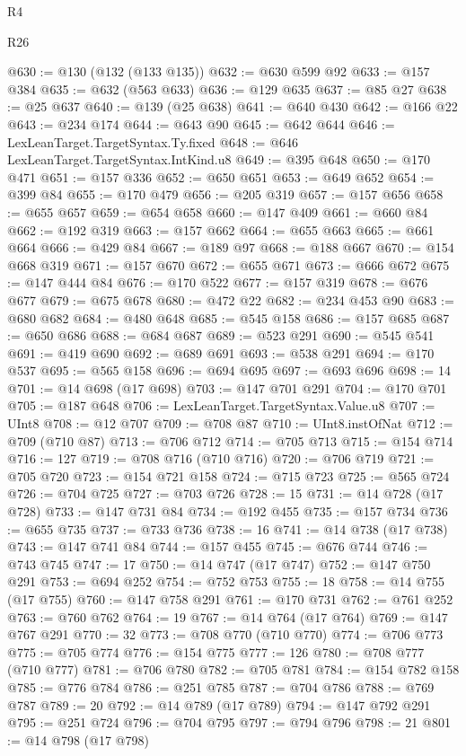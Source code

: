 \begin{lexlean}{R4}
\begin{lexlean}{R26}
\begin{coremodule}
{{{{{{{{{{{{{{{{{{{{{{{{{{{{{{{{{{{{{{{{{{{{{{{{{{{{{{{{{{{{{{{{{{{{{{{{@630 := @130 (@132 (@133 @135))
@632 := @630 @599 @92
@633 := @157 @384
@635 := @632 (@563 @633)
@636 := @129 @635
@637 := @85 @27
@638 := @25 @637
@640 := @139 (@25 @638)
@641 := @640 @430
@642 := @166 @22
@643 := @234 @174
@644 := @643 @90
@645 := @642 @644
@646 := LexLeanTarget.TargetSyntax.Ty.fixed
@648 := @646 LexLeanTarget.TargetSyntax.IntKind.u8
@649 := @395 @648
@650 := @170 @471
@651 := @157 @336
@652 := @650 @651
@653 := @649 @652
@654 := @399 @84
@655 := @170 @479
@656 := @205 @319
@657 := @157 @656
@658 := @655 @657
@659 := @654 @658
@660 := @147 @409
@661 := @660 @84
@662 := @192 @319
@663 := @157 @662
@664 := @655 @663
@665 := @661 @664
@666 := @429 @84
@667 := @189 @97
@668 := @188 @667
@670 := @154 @668 @319
@671 := @157 @670
@672 := @655 @671
@673 := @666 @672
@675 := @147 @444 @84
@676 := @170 @522
@677 := @157 @319
@678 := @676 @677
@679 := @675 @678
@680 := @472 @22
@682 := @234 @453 @90
@683 := @680 @682
@684 := @480 @648
@685 := @545 @158
@686 := @157 @685
@687 := @650 @686
@688 := @684 @687
@689 := @523 @291
@690 := @545 @541
@691 := @419 @690
@692 := @689 @691
@693 := @538 @291
@694 := @170 @537
@695 := @565 @158
@696 := @694 @695
@697 := @693 @696
@698 := 14
@701 := @14 @698 (@17 @698)
@703 := @147 @701 @291
@704 := @170 @701
@705 := @187 @648
@706 := LexLeanTarget.TargetSyntax.Value.u8
@707 := UInt8
@708 := @12 @707
@709 := @708 @87
@710 := UInt8.instOfNat
@712 := @709 (@710 @87)
@713 := @706 @712
@714 := @705 @713
@715 := @154 @714
@716 := 127
@719 := @708 @716 (@710 @716)
@720 := @706 @719
@721 := @705 @720
@723 := @154 @721 @158
@724 := @715 @723
@725 := @565 @724
@726 := @704 @725
@727 := @703 @726
@728 := 15
@731 := @14 @728 (@17 @728)
@733 := @147 @731 @84
@734 := @192 @455
@735 := @157 @734
@736 := @655 @735
@737 := @733 @736
@738 := 16
@741 := @14 @738 (@17 @738)
@743 := @147 @741 @84
@744 := @157 @455
@745 := @676 @744
@746 := @743 @745
@747 := 17
@750 := @14 @747 (@17 @747)
@752 := @147 @750 @291
@753 := @694 @252
@754 := @752 @753
@755 := 18
@758 := @14 @755 (@17 @755)
@760 := @147 @758 @291
@761 := @170 @731
@762 := @761 @252
@763 := @760 @762
@764 := 19
@767 := @14 @764 (@17 @764)
@769 := @147 @767 @291
@770 := 32
@773 := @708 @770 (@710 @770)
@774 := @706 @773
@775 := @705 @774
@776 := @154 @775
@777 := 126
@780 := @708 @777 (@710 @777)
@781 := @706 @780
@782 := @705 @781
@784 := @154 @782 @158
@785 := @776 @784
@786 := @251 @785
@787 := @704 @786
@788 := @769 @787
@789 := 20
@792 := @14 @789 (@17 @789)
@794 := @147 @792 @291
@795 := @251 @724
@796 := @704 @795
@797 := @794 @796
@798 := 21
@801 := @14 @798 (@17 @798)
}}}}}}}}}}}}}}}}}}}}}}}}}}}}}}}}}}}}}}}}}}}}}}}}}}}}}}}}}}}}}}}}}}}}}}}}
\end{coremodule}
\end{lexlean}
\end{lexlean}
